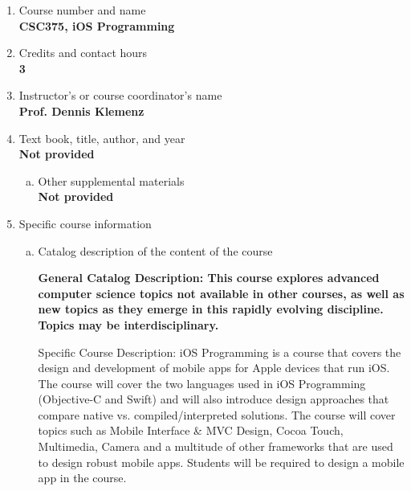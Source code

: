 \label{CSC375-DB}  %
\begin{enumerate}[1.]
\item Course number and name\\
  {\bfseries
    CSC375, iOS Programming
  }

\item Credits and contact hours\\
  {\bfseries
    3
  }

\item Instructor's or course coordinator's name\\
  {\bfseries
    Prof. Dennis Klemenz
  }

\item Text book, title, author, and year\\
  {\bfseries
    Not provided
  }
\begin{enumerate}[a.]
\item Other supplemental materials\\
  {\bfseries
    Not provided
  }
\end{enumerate}

\item Specific course information
\begin{enumerate}[a.]
\item Catalog description of the content of the course\\
  {\bfseries
General Catalog Description: This course explores advanced computer science topics not available in other courses, as well as new topics as they emerge in this rapidly evolving discipline. Topics may be interdisciplinary.

Specific Course Description: iOS Programming is a course that covers the
design and development of mobile apps for Apple devices that run iOS.  The
course will cover the two languages used in iOS Programming (Objective-C and
Swift) and will also introduce design approaches that compare native vs.
compiled/interpreted solutions.  The course will cover topics such as Mobile
Interface \& MVC Design, Cocoa Touch, Multimedia, Camera and a multitude of
other frameworks that are used to design robust mobile apps.  Students will be
required to design a mobile app in the course.
  }


\end{enumerate}
\end{enumerate}
